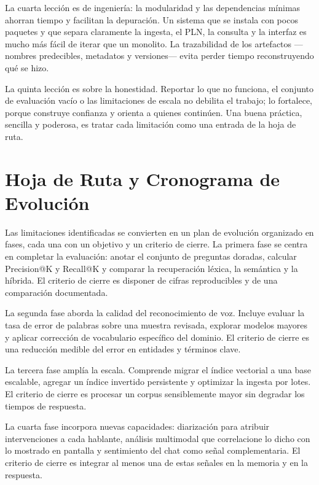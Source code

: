 \documentclass[12pt,a4paper]{article}
\begin{document}
La cuarta lección es de ingeniería: la modularidad y las dependencias mínimas ahorran tiempo y facilitan la depuración. Un sistema que se instala con pocos paquetes y que separa claramente la ingesta, el PLN, la consulta y la interfaz es mucho más fácil de iterar que un monolito. La trazabilidad de los artefactos —nombres predecibles, metadatos y versiones— evita perder tiempo reconstruyendo qué se hizo.

La quinta lección es sobre la honestidad. Reportar lo que no funciona, el conjunto de evaluación vacío o las limitaciones de escala no debilita el trabajo; lo fortalece, porque construye confianza y orienta a quienes continúen. Una buena práctica, sencilla y poderosa, es tratar cada limitación como una entrada de la hoja de ruta.



\section{Hoja de Ruta y Cronograma de Evolución}
\label{sec:hojaruta}

Las limitaciones identificadas se convierten en un plan de evolución organizado en fases, cada una con un objetivo y un criterio de cierre. La primera fase se centra en completar la evaluación: anotar el conjunto de preguntas doradas, calcular Precision@K y Recall@K y comparar la recuperación léxica, la semántica y la híbrida. El criterio de cierre es disponer de cifras reproducibles y de una comparación documentada.

La segunda fase aborda la calidad del reconocimiento de voz. Incluye evaluar la tasa de error de palabras sobre una muestra revisada, explorar modelos mayores y aplicar corrección de vocabulario específico del dominio. El criterio de cierre es una reducción medible del error en entidades y términos clave.

La tercera fase amplía la escala. Comprende migrar el índice vectorial a una base escalable, agregar un índice invertido persistente y optimizar la ingesta por lotes. El criterio de cierre es procesar un corpus sensiblemente mayor sin degradar los tiempos de respuesta.

La cuarta fase incorpora nuevas capacidades: diarización para atribuir intervenciones a cada hablante, análisis multimodal que correlacione lo dicho con lo mostrado en pantalla y sentimiento del chat como señal complementaria. El criterio de cierre es integrar al menos una de estas señales en la memoria y en la respuesta.
\end{document}
